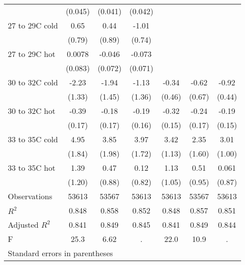 \documentclass[paper=letterpaper, fontsize=11pt]{article} %
\begin{document}
\begin{longtable}{l*{6}{c}}
                    &     (0.045)&     (0.041)&     (0.042)&            &            &            \\
27 to 29C cold      &        0.65&        0.44&       -1.01&            &            &            \\
                    &      (0.79)&      (0.89)&      (0.74)&            &            &            \\
27 to 29C hot       &      0.0078&      -0.046&      -0.073&            &            &            \\
                    &     (0.083)&     (0.072)&     (0.071)&            &            &            \\
30 to 32C cold      &       -2.23&       -1.94&       -1.13&       -0.34&       -0.62&       -0.92\\
                    &      (1.33)&      (1.45)&      (1.36)&      (0.46)&      (0.67)&      (0.44)\\
30 to 32C hot       &       -0.39&       -0.18&       -0.19&       -0.32&       -0.24&       -0.19\\
                    &      (0.17)&      (0.17)&      (0.16)&      (0.15)&      (0.17)&      (0.15)\\
33 to 35C cold      &        4.95&        3.85&        3.97&        3.42&        2.35&        3.01\\
                    &      (1.84)&      (1.98)&      (1.72)&      (1.13)&      (1.60)&      (1.00)\\
33 to 35C hot       &        1.39&        0.47&        0.12&        1.13&        0.51&       0.061\\
                    &      (1.20)&      (0.88)&      (0.82)&      (1.05)&      (0.95)&      (0.87)\\
\hline
Observations        &       53613&       53567&       53613&       53613&       53567&       53613\\
\(R^{2}\)           &       0.848&       0.858&       0.852&       0.848&       0.857&       0.851\\
Adjusted \(R^{2}\)  &       0.841&       0.849&       0.845&       0.841&       0.849&       0.844\\
F                   &        25.3&        6.62&           .&        22.0&        10.9&           .\\
\hline\hline
\multicolumn{7}{l}{\footnotesize Standard errors in parentheses}\\
\end{longtable}
\end{document}
